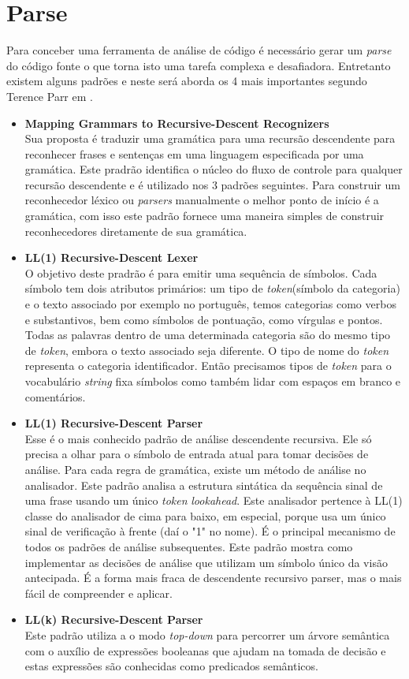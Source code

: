 \section{Parse}

Para conceber uma ferramenta de análise de código é necessário gerar um \textit{parse} do código fonte o que torna isto uma tarefa complexa e desafiadora. Entretanto existem alguns padrões e neste será aborda os 4 mais importantes segundo Terence Parr em \cite{Parr:2009:LIP:1823613}.
\begin{itemize}
	\item \textbf{Mapping Grammars to Recursive-Descent Recognizers}\\
	Sua proposta é traduzir uma gramática para uma recursão descendente para reconhecer frases e sentenças em uma linguagem especificada por uma gramática. Este pradrão identifica o núcleo do fluxo de controle para qualquer recursão descendente e é utilizado nos 3 padrões seguintes. 
	Para construir um reconhecedor léxico ou \textit{parsers} manualmente o melhor ponto de início é a gramática, com isso este padrão fornece uma maneira simples de construir reconhecedores diretamente de sua gramática.
	
	\item \textbf{LL(1) Recursive-Descent Lexer}\\
	O objetivo deste pradrão é para emitir uma sequência de símbolos. Cada símbolo tem dois atributos primários: um tipo de \textit{token}(símbolo da categoria) e o texto associado por exemplo 
	no português, temos categorias como verbos e substantivos, bem como símbolos de pontuação, como vírgulas e pontos. Todas as palavras dentro de uma determinada categoria são do mesmo tipo de \textit{token}, embora o texto associado seja diferente. O tipo de nome do \textit{token} representa o categoria identificador. Então precisamos tipos de \textit{token} para o vocabulário \textit{string} fixa símbolos como também lidar com espaços em branco e comentários.
	\item \textbf{LL(1) Recursive-Descent Parser}\\
	Esse é o mais conhecido padrão de análise descendente recursiva. Ele só precisa	a olhar para o símbolo de entrada atual para tomar decisões de análise. Para cada regra de gramática, existe um método de análise no analisador. Este padrão analisa a estrutura sintática da sequência sinal de uma frase usando um único \textit{token} \textit{lookahead}. Este analisador pertence à LL(1) classe do analisador de cima para baixo, em especial, porque usa um único sinal de verificação à frente (daí o "1" no nome). É o principal mecanismo de todos os padrões de análise subsequentes. Este padrão mostra como implementar as decisões de análise que utilizam um símbolo único da visão antecipada. É a forma mais fraca de descendente recursivo parser, mas o mais fácil de compreender e aplicar.
	\item \textbf{LL(k) Recursive-Descent Parser}\\
	Este padrão utiliza a o modo \textit{top-down} para percorrer um árvore semântica com o auxílio de expressões booleanas que ajudam na tomada de decisão e estas expressões são conhecidas como predicados semânticos.
	
\end{itemize}


%
